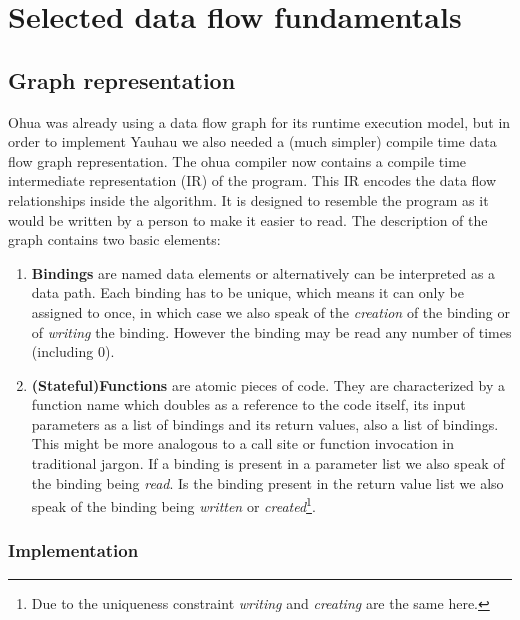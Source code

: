 
\chapter{Selected data flow fundamentals} %

\label{ChapterDataFlow}

\section{Graph representation}

Ohua was already using a data flow graph for its runtime execution model, but in order to implement Yauhau we also needed a (much simpler) compile time data flow graph representation.
The ohua compiler now contains a compile time intermediate representation (IR) of the program.
This IR encodes the data flow relationships inside the algorithm.
It is designed to resemble the program as it would be written by a person to make it easier to read.
The description of the graph contains two basic elements:
\begin{enumerate}
    \item \textbf{Bindings} are named data elements or alternatively can be interpreted as a data path. Each binding has to be unique, which means it can only be assigned to once, in which case we also speak of the \textit{creation} of the binding or of \textit{writing} the binding. However the binding may be read any number of times (including 0).
    \item \textbf{(Stateful)Functions} are atomic pieces of code. They are characterized by a function name which doubles as a reference to the code itself, its input parameters as a list of bindings and its return values, also a list of bindings.
    This might be more analogous to a call site or function invocation in traditional jargon.
    If a binding is present in a parameter list we also speak of the binding being \textit{read}.
    Is the binding present in the return value list we also speak of the binding being \textit{written} or \textit{created}\footnote{Due to the uniqueness constraint \textit{writing} and \textit{creating} are the same here.}.
\end{enumerate}

\subsection{Implementation}

